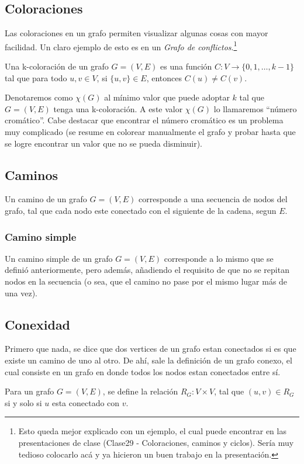 \documentclass[../main.tex]{subfiles}
\begin{document}
\subsection{Coloraciones}
Las coloraciones en un grafo permiten visualizar algunas cosas con mayor facilidad. Un claro ejemplo de esto es en un \textit{Grafo de conflictos}.\footnote{Esto queda mejor explicado con un ejemplo, el cual puede encontrar en las presentaciones de clase (Clase29 - Coloraciones, caminos y ciclos). Sería muy tedioso colocarlo acá y ya hicieron un buen trabajo en la presentación.}

Una k-coloración de un grafo $G = (V,E)$ es una función $C: V \rightarrow \{0, 1, \ldots, k-1\}$ tal que para todo $u,v \in V$, si $\{u,v\} \in E$, entonces $C(u) \not= C(v)$.

Denotaremos como $\chi(G)$ al mínimo valor que puede adoptar $k$ tal que $G = (V,E)$ tenga una k-coloración. A este valor $\chi(G)$ lo llamaremos ``número cromático''. Cabe destacar que encontrar el número cromático es un problema muy complicado (se resume en colorear manualmente el grafo y probar hasta que se logre encontrar un valor que no se pueda disminuir).

\subsection{Caminos}
Un camino de un grafo $G = (V,E)$ corresponde a una secuencia de nodos del grafo, tal que cada nodo este conectado con el siguiente de la cadena, segun $E$.

\subsubsection{Camino simple}
Un camino simple de un grafo $G = (V,E)$ corresponde a lo mismo que se definió anteriormente, pero además, añadiendo el requisito de que no se repitan nodos en la secuencia (o sea, que el camino no pase por el mismo lugar más de una vez).

\subsection{Conexidad}
Primero que nada, se dice que dos vertices de un grafo estan conectados si es que existe un camino de uno al otro. De ahí, sale la definición de un grafo conexo, el cual consiste en un grafo en donde todos los nodos estan conectados entre sí.

Para un grafo $G = (V,E)$, se define la relación $R_G: V \times V$, tal que $(u,v) \in R_G$ si y solo si $u$ esta conectado con $v$.
\end{document}
